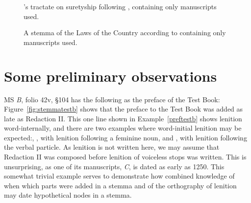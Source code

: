 \begin{figure}[h]
  \centering
  \caption{'s tractate on suretyship following \textcite[138]{charles-edwards_lawyers_1986}, containing only manuscripts used.}
  \label{fig:suretyshstemma2}
\end{figure}

 \begin{figure}[h]
    \centering
{}
    \caption{A stemma of the Laws of the Country  according to \textcite{charles-edwards_textual_2016} containing only manuscripts used.}
    \label{fig:stemmalawc}
  \end{figure}
\section{Some preliminary observations}
\label{sec:some-prel-observ}

MS \textit{B}, folio 42v, \S 104 has the following as the preface of the Test Book:
Figure~\ref{fig:stemmatestb} shows that the preface to the Test Book was added as late as Redaction II.
This one line shown in Example~\ref{preftestb} shows lenition word-internally, and there are two examples  where word-initial lenition may be expected:, , with lenition following a feminine noun, and , with lenition following the verbal particle.
As lenition  is not written here, we may assume that Redaction II was composed before lenition of voiceless stops was written.
This is unsurprising, as one of its manuscripts, \textit{C}, is dated as early as 1250.
This somewhat trivial example serves to demonstrate how combined knowledge of when which parts were added in a stemma and of the orthography of lenition may date hypothetical nodes in a stemma. 


